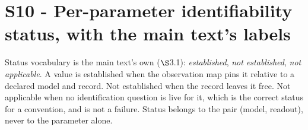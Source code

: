 \documentclass[11pt]{article}
\begin{document}
\section*{S10 - Per-parameter identifiability status, with the main text's labels}\label{s10---per-parameter-identifiability-status-with-the-main-text's-labels}

Status vocabulary is the main text's own (\(\S\)3.1): \emph{established}, \emph{not established}, \emph{not applicable}. A value is established when the observation map pins it relative to a declared model and record. Not established when the record leaves it free. Not applicable when no identification question is live for it, which is the correct status for a convention, and is not a failure. Status belongs to the pair (model, readout), never to the parameter alone.
\end{document}
